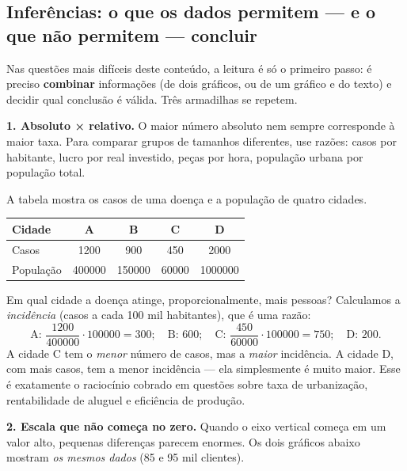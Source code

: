 \subsection{Inferências: o que os dados permitem — e o que não permitem — concluir}

Nas questões mais difíceis deste conteúdo, a leitura é só o primeiro passo: é
preciso \textbf{combinar} informações (de dois gráficos, ou de um gráfico e do
texto) e decidir qual conclusão é válida. Três armadilhas se repetem.

\textbf{1. Absoluto × relativo.} O maior número absoluto nem sempre corresponde
à maior taxa. Para comparar grupos de tamanhos diferentes, use razões: casos por
habitante, lucro por real investido, peças por hora, população urbana por
população total.

\begin{exemplo}
A tabela mostra os casos de uma doença e a população de quatro cidades.

\begin{center}\small
\begin{tabular}{lcccc}
\toprule
Cidade & A & B & C & D\\
\midrule
Casos & \num{1200} & 900 & 450 & \num{2000}\\
População & \num{400000} & \num{150000} & \num{60000} & \num{1000000}\\
\bottomrule
\end{tabular}
\end{center}
Em qual cidade a doença atinge, proporcionalmente, mais pessoas?
\solucao
Calculamos a \emph{incidência} (casos a cada 100 mil habitantes), que é uma razão:
\[
\text{A: }\frac{\num{1200}}{\num{400000}}\cdot\num{100000}=300;\quad
\text{B: }600;\quad
\text{C: }\frac{450}{\num{60000}}\cdot\num{100000}=750;\quad
\text{D: }200.
\]
A cidade C tem o \emph{menor} número de casos, mas a \emph{maior} incidência. A
cidade D, com mais casos, tem a menor incidência — ela simplesmente é muito
maior. Esse é exatamente o raciocínio cobrado em questões sobre taxa de
urbanização, rentabilidade de aluguel e eficiência de produção.
\end{exemplo}

\textbf{2. Escala que não começa no zero.} Quando o eixo vertical começa em um
valor alto, pequenas diferenças parecem enormes. Os dois gráficos abaixo mostram
\emph{os mesmos dados} (85 e 95 mil clientes).

